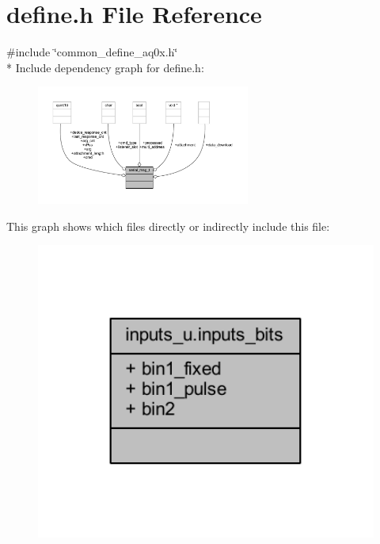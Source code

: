 \hypertarget{a00090}{\section{define.\+h File Reference}
\label{a00090}
}
{\ttfamily \#include \char`\"{}common\+\_\+define\+\_\+aq0x.\+h\char`\"{}}\\*
Include dependency graph for define.\+h\+:
\nopagebreak
\begin{figure}[H]
\begin{center}
\leavevmode
\includegraphics[width=199pt]{d0/d1f/a00247}
\end{center}
\end{figure}
This graph shows which files directly or indirectly include this file\+:
\nopagebreak
\begin{figure}[H]
\begin{center}
\leavevmode
\includegraphics[width=350pt]{dd/dd7/a00248}
\end{center}
\end{figure}
